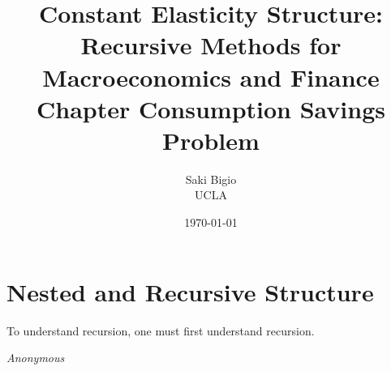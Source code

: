 \documentclass[12pt,openany]{book}
\title{Constant Elasticity Structure: \\ Recursive Methods for Macroeconomics and Finance \\ Chapter Consumption Savings Problem}
\author{Saki Bigio \\UCLA}
\date{\today}
\begin{document}
\frontmatter
\maketitle

\tableofcontents

\mainmatter

\chapter*{Nested and Recursive Structure}

\epigraph{To understand recursion, one must first understand recursion.}{\textit{Anonymous}}



\backmatter


\end{document}
